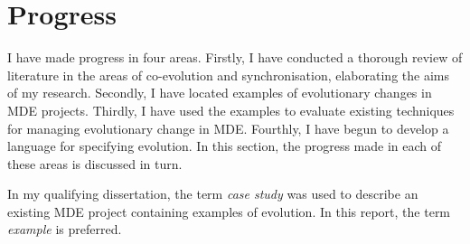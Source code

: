 \section{Progress}
\label{sec:progress}
I have made progress in four areas. Firstly, I have conducted a thorough review of literature in the areas of co-evolution and synchronisation, elaborating the aims of my research. Secondly, I have located examples of evolutionary changes in MDE projects. Thirdly, I have used the examples to evaluate existing techniques for managing evolutionary change in MDE. Fourthly, I have begun to develop a language for specifying evolution. In this section, the progress made in each of these areas is discussed in turn.

In my qualifying dissertation, the term \emph{case study} was used to describe an existing MDE project containing examples of evolution. In this report, the term \emph{example} is preferred.





